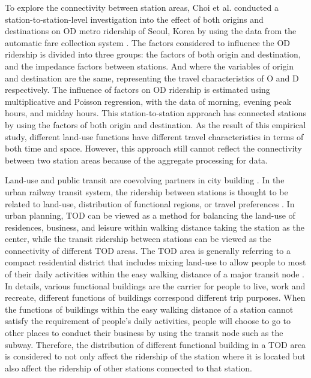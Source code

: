 %
To explore the connectivity between station areas, Choi et al. conducted a station-to-station-level investigation into the effect of both origins and destinations on OD metro ridership of Seoul, Korea by using the data from the automatic fare collection system \cite{choi2012analysis}. The factors considered to influence the OD ridership is divided into three groups: the factors of both origin and destination, and the impedance factors between stations. And where the variables of origin and destination are the same, representing the travel characteristics of O and D respectively. The influence of factors on OD ridership is estimated using multiplicative and Poisson regression, with the data of morning, evening peak hours, and midday hours. This station-to-station approach has connected stations by using the factors of both origin and destination. As the result of this empirical study, different land-use functions have different travel characteristics in terms of both time and space. However, this approach still cannot reflect the connectivity between two station areas because of the aggregate processing for data.

%
Land-use and public transit are coevolving partners in city building \cite{handy2005smart,dittmar2012new}. In the urban railway transit system, the ridership between stations is thought to be related to land-use, distribution of functional regions, or travel preferences \cite{thompson1997achieving}. In urban planning, TOD can be viewed as a method for balancing the land-use of residences, business, and leisure within walking distance taking the station as the center, while the transit ridership between stations can be viewed as the connectivity of different TOD areas. The TOD area is generally referring to a compact residential district that includes mixing land-use to allow people to most of their daily activities within the easy walking distance of a major transit node \cite{lund2004travel}. In details, various functional buildings are the carrier for people to live, work and recreate, different functions of buildings correspond different trip purposes. When the functions of buildings within the easy walking distance of a station cannot satisfy the requirement of people’s daily activities, people will choose to go to other places to conduct their business by using the transit node such as the subway. Therefore, the distribution of different functional building in a TOD area is considered to not only affect the ridership of the station where it is located but also affect the ridership of other stations connected to that station.

